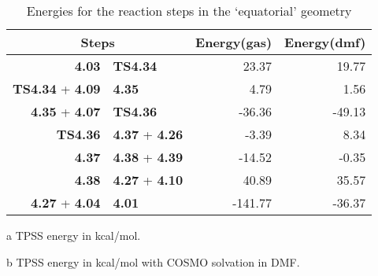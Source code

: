 \begin{table}[!htb]
\centering
 \begin{threeparttable}
  \caption{Energies for the reaction steps in the `equatorial' geometry}
    \begin{tabular}{r@{ $\rightarrow$ }lrr}
    \toprule
    \multicolumn{2}{c}{Steps} & Energy(gas)\tnote{a} & Energy(dmf)\tnote{b} \\
    \midrule
    \textbf{4.03} & \textbf{TS4.34} & 23.37 & 19.77 \\
    \textbf{TS4.34} + \textbf{4.09} & \textbf{4.35} & 4.79 & 1.56 \\
    \textbf{4.35} + \textbf{4.07} & \textbf{TS4.36} & -36.36 & -49.13 \\
    \textbf{TS4.36} & \textbf{4.37} + \textbf{4.26} & -3.39 & 8.34 \\
    \textbf{4.37} & \textbf{4.38} + \textbf{4.39} & -14.52 & -0.35 \\
    \textbf{4.38} & \textbf{4.27} + \textbf{4.10} & 40.89 & 35.57 \\
    \textbf{4.27} + \textbf{4.04} & \textbf{4.01} & -141.77 & -36.37 \\
    \bottomrule
    \end{tabular}%
    \begin{tablenotes}
    \item [a] TPSS energy in kcal/mol.
    \item [b] TPSS energy in kcal/mol with COSMO solvation in DMF.
    \end{tablenotes}
  \label{tab.siderxn}%
 \end{threeparttable}
\end{table}%


